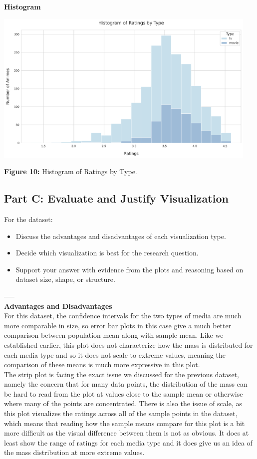 \textbf{Histogram}
\begin{center}
  \includegraphics[width=0.95\textwidth]{figures/ratings_by_type_histogram_plot.png}
  
  \textbf{Figure 10:} Histogram of Ratings by Type.
\end{center}
\newpage

\subsection{Part C: Evaluate and Justify Visualization}
For the dataset:
\begin{itemize}
    \item Discuss the advantages and disadvantages of each visualization type.
    \item Decide which visualization is best for the research question.
    \item Support your answer with evidence from the plots and reasoning based on dataset size, shape, or structure.
\end{itemize}
-----\\
\textbf{Advantages and Disadvantages}\\
For this dataset, the confidence intervals for the two types of media are much more comparable in size, so error bar plots in this case give a much better comparison between population mean along with sample mean. Like we established earlier, this plot does not characterize how the mass is distributed for each media type and so it does not scale to extreme values, meaning the comparison of these means is much more expressive in this plot.\\

The strip plot is facing the exact issue we discussed for the previous dataset, namely the concern that for many data points, the distribution of the mass can be hard to read from the plot at values close to the sample mean or otherwise where many of the points are concentrated. There is also the issue of scale, as this plot visualizes the ratings across all of the sample points in the dataset, which means that reading how the sample means compare for this plot is a bit more difficult as the visual difference between them is not as obvious. It does at least show the range of ratings for each media type and it does give us an idea of the mass distribution at more extreme values.\\

